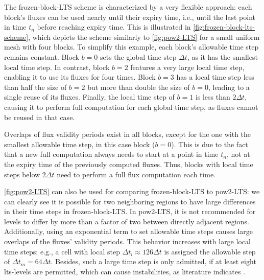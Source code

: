 The \gls{frozen-block-LTS} scheme is characterized by a very flexible approach:
each block's fluxes can be used nearly until their expiry time, i.e., until the last point in time $t_n$ before reaching expiry time. 
This is illustrated in \autoref{fig:frozen-block-lts-scheme}, which depicts the scheme similarly to \autoref{fig:pow2-LTS} for a small uniform mesh with four blocks.
To simplify this example, each block's allowable time step remains constant.
Block $b=0$ sets the global time step $\Delta t$, as it has the smallest local time step. 
In contrast, block $b=2$ features a very large local time step, enabling it to use its fluxes for four times.
Block $b=3$ has a local time step less than half the size of $b=2$ but more than double the size of $b=0$, leading to a single reuse of its fluxes. 
Finally, the local time step of $b=1$ is less than $2 \Delta t$, causing it to perform full computation for each global time step, as fluxes cannot be reused in that case.

Overlaps of flux validity periods exist in all blocks, except for the one with the smallest allowable time step, in this case block ($b=0$). 
This is due to the fact that a new full computation always needs to start at a point in time $t_n$, not at the expiry time of the previously computed fluxes.
Thus, blocks with local time steps below $2 \Delta t$ need to perform a full flux computation each time.

\autoref{fig:pow2-LTS} can also be used for comparing \gls{frozen-block-LTS} to \gls{pow2-LTS}: we can clearly see it is possible for two neighboring regions to have large differences in their time steps in \gls{frozen-block-LTS}.
In \gls{pow2-LTS}, it is not recommended for levels to differ by more than a factor of two between directly adjacent regions.
\label{fix:pow2-LTS-drawbacks}Additionally, using an exponential term to set allowable time steps causes large overlaps of the fluxes' validity periods. 
This behavior increases with large local time steps:
e.g., a cell with local step $\Delta t_i \approx 126 \Delta t$ is assigned the allowable step of $\Delta t_m = 64 \Delta t$. 
Besides, such a large time step is only admitted, if at least eight \gls{lts}-levels are permitted, which can cause instabilities, as literature indicates \autocite{hu2019, sanders2008}.

